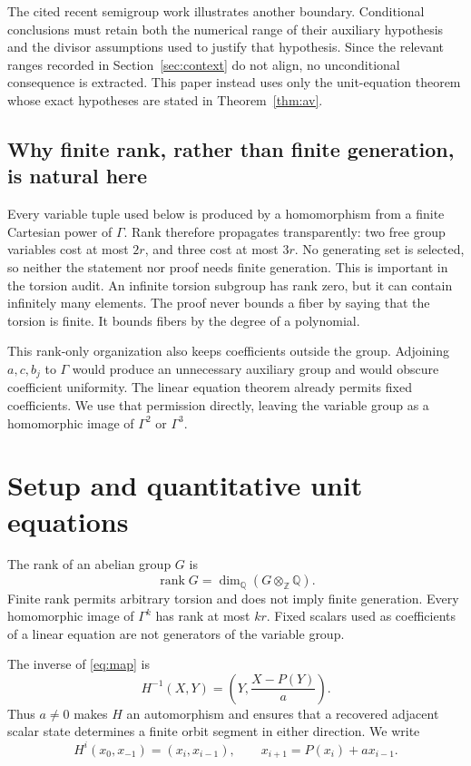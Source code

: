 \documentclass[11pt]{article}
\theoremstyle{definition}
\begin{document}
The cited recent semigroup work illustrates another boundary. Conditional conclusions must retain both the numerical range of their auxiliary hypothesis and the divisor assumptions used to justify that hypothesis. Since the relevant ranges recorded in Section~\ref{sec:context} do not align, no unconditional consequence is extracted. This paper instead uses only the unit-equation theorem whose exact hypotheses are stated in Theorem~\ref{thm:av}.

\subsection{Why finite rank, rather than finite generation, is natural here}

Every variable tuple used below is produced by a homomorphism from a finite Cartesian power of \(\Gamma\). Rank therefore propagates transparently: two free group variables cost at most \(2r\), and three cost at most \(3r\). No generating set is selected, so neither the statement nor proof needs finite generation. This is important in the torsion audit. An infinite torsion subgroup has rank zero, but it can contain infinitely many elements. The proof never bounds a fiber by saying that the torsion is finite. It bounds fibers by the degree of a polynomial.

This rank-only organization also keeps coefficients outside the group. Adjoining \(a,c,b_j\) to \(\Gamma\) would produce an unnecessary auxiliary group and would obscure coefficient uniformity. The linear equation theorem already permits fixed coefficients. We use that permission directly, leaving the variable group as a homomorphic image of \(\Gamma^2\) or \(\Gamma^3\).

\section{Setup and quantitative unit equations}
\label{sec:setup}

The rank of an abelian group \(G\) is
\[
 \operatorname{rank}G=\dim_{\mathbb Q}(G\otimes_{\mathbb Z}\mathbb Q).
\]
Finite rank permits arbitrary torsion and does not imply finite generation. Every homomorphic image of \(\Gamma^k\) has rank at most \(kr\). Fixed scalars used as coefficients of a linear equation are not generators of the variable group.

The inverse of \eqref{eq:map} is
\begin{equation}
 H^{-1}(X,Y)=\left(Y,\frac{X-P(Y)}a\right).
 \label{eq:inverse}
\end{equation}
Thus \(a\neq0\) makes \(H\) an automorphism and ensures that a recovered adjacent scalar state determines a finite orbit segment in either direction. We write
\[
 H^i(x_0,x_{-1})=(x_i,x_{i-1}),
 \qquad
 x_{i+1}=P(x_i)+ax_{i-1}.
\]
\end{document}
